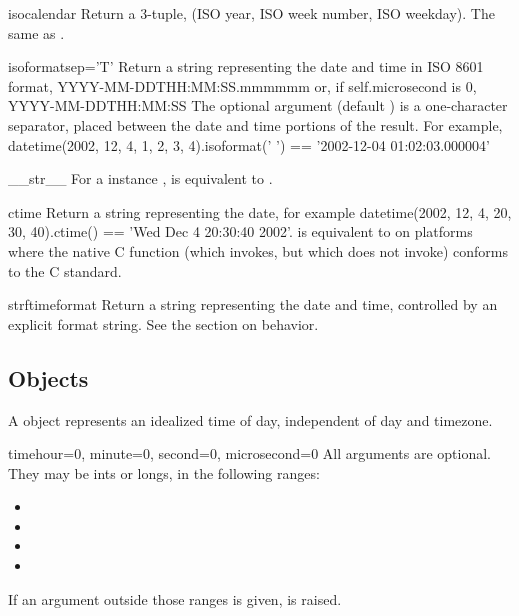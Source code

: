 \begin{methoddesc}{isocalendar}{}
  Return a 3-tuple, (ISO year, ISO week number, ISO weekday).  The
  same as .
\end{methoddesc}

\begin{methoddesc}{isoformat}{sep='T'}
  Return a string representing the date and time in ISO 8601 format,
      YYYY-MM-DDTHH:MM:SS.mmmmmm
  or, if self.microsecond is 0,
      YYYY-MM-DDTHH:MM:SS
  The optional argument  (default ) is a
  one-character separator, placed between the date and time portions
  of the result.  For example,
      datetime(2002, 12, 4, 1, 2, 3, 4).isoformat(' ') ==
      '2002-12-04 01:02:03.000004'
\end{methoddesc}

\begin{methoddesc}{__str__}{}
  For a  instance ,  is
  equivalent to .
\end{methoddesc}

\begin{methoddesc}{ctime}{}
  Return a string representing the date, for example
  datetime(2002, 12, 4, 20, 30, 40).ctime() == 'Wed Dec  4 20:30:40 2002'.
   is equivalent to
   on platforms where
  the native C  function (which
   invokes, but which
   does not invoke) conforms to the C
  standard.
\end{methoddesc}

\begin{methoddesc}{strftime}{format}
  Return a string representing the date and time, controlled by an
  explicit format string.  See the section on 
  behavior.
\end{methoddesc}


\subsection{ Objects \label{datetime-time}}

A  object represents an idealized time of day, independent
of day and timezone.

\begin{classdesc}{time}{hour=0, minute=0, second=0, microsecond=0}
  All arguments are optional.  They may be ints or longs, in the
  following ranges:

\begin{itemize}
  \item {}
  \item {}
  \item {}
  \item {}
\end{itemize}

  If an argument outside those ranges is given, 
  is raised.
\end{classdesc}

